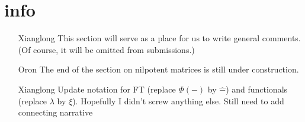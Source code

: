 \section*{info}
\begin{itemize}
	\item[Xianglong] This section will serve as a place for us to write general comments. (Of course, it will be omitted from submissions.)

    \item[Oron] The end of the section on nilpotent matrices is still under construction.
    
    \item[Xianglong] Update notation for FT (replace $\Phi(-)$ by $\widehat{-}$) and functionals (replace $\lambda$ by $\xi$). Hopefully I didn't screw anything else. Still need to add connecting narrative
\end{itemize}
\newpage
